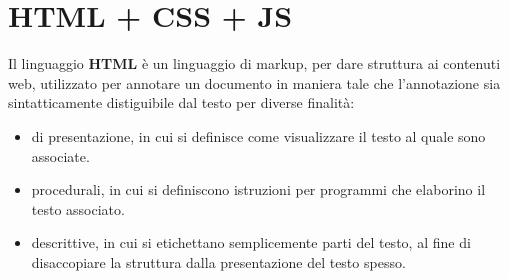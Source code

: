 \documentclass[a4paper,12pt, oneside]{book}
\begin{document}
\chapter{HTML + CSS + JS}
Il linguaggio \textbf{HTML} è un linguaggio di markup, per dare struttura ai contenuti web,
utilizzato per annotare un documento in maniera tale che l'annotazione sia sintatticamente
distiguibile dal testo per diverse finalità:
\begin{itemize}
    \item di presentazione, in cui si definisce come visualizzare il testo al quale sono associate.
    \item procedurali, in cui si definiscono istruzioni per programmi che elaborino il testo associato.
    \item descrittive, in cui si etichettano semplicemente parti del testo, 
        al fine di disaccopiare la struttura dalla presentazione del testo spesso.
\end{itemize}
\end{document}
